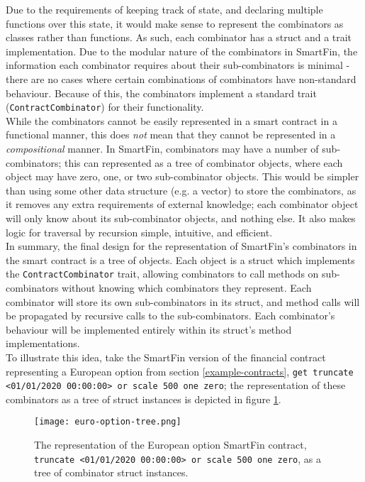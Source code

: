 Due to the requirements of keeping track of state, and declaring multiple functions over this state, it would make sense to represent the combinators as classes rather than functions. As such, each combinator has a struct and a trait implementation. Due to the modular nature of the combinators in SmartFin, the information each combinator requires about their sub-combinators is minimal - there are no cases where certain combinations of combinators have non-standard behaviour. Because of this, the combinators implement a standard trait (\texttt{ContractCombinator}) for their functionality. \\

While the combinators cannot be easily represented in a smart contract in a functional manner, this does \textit{not} mean that they cannot be represented in a \textit{compositional} manner. In SmartFin, combinators may have a number of sub-combinators; this can represented as a tree of combinator objects, where each object may have zero, one, or two sub-combinator objects. This would be simpler than using some other data structure (e.g. a vector) to store the combinators, as it removes any extra requirements of external knowledge; each combinator object will only know about its sub-combinator objects, and nothing else. It also makes logic for traversal by recursion simple, intuitive, and efficient. \\

In summary, the final design for the representation of SmartFin's combinators in the smart contract is a tree of objects. Each object is a struct which implements the \texttt{ContractCombinator} trait, allowing combinators to call methods on sub-combinators without knowing which combinators they represent. Each combinator will store its own sub-combinators in its struct, and method calls will be propagated by recursive calls to the sub-combinators. Each combinator's behaviour will be implemented entirely within its struct's method implementations. \\

To illustrate this idea, take the SmartFin version of the financial contract representing a European option from section \ref{example-contracts}, \texttt{get truncate <01/01/2020 00:00:00> or scale 500 one zero}; the representation of these combinators as a tree of struct instances is depicted in figure \ref{fig:euro-option-tree}. \\

\begin{figure}[h]
    \centering
    \texttt{[image: euro-option-tree.png]}
    \caption{The representation of the European option SmartFin contract, \texttt{truncate <01/01/2020 00:00:00> or scale 500 one zero}, as a tree of combinator struct instances.}
    \label{fig:euro-option-tree}
\end{figure}


